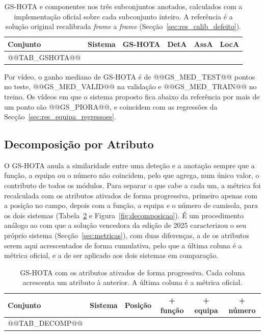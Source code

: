 \begin{table}[htbp]
    \centering
    \caption{GS-HOTA e componentes nos três subconjuntos anotados, calculados com a implementação
    oficial sobre cada subconjunto inteiro. A referência é a solução original recalibrada
    \emph{frame} a \emph{frame} (Secção~\ref{sec:res_calib_defeito}).}
    \label{tab:gshota}
    \begin{tabular}{|l|l|c|c|c|c|}
        \hline
        \textbf{Conjunto} & \textbf{Sistema} & \textbf{GS-HOTA} & \textbf{DetA} & \textbf{AssA} & \textbf{LocA} \\
        \hline
@@TAB_GSHOTA@@
        \hline
    \end{tabular}
\end{table}

Por vídeo, o ganho mediano de GS-HOTA é de @@GS_MED_TEST@@ pontos no teste, @@GS_MED_VALID@@ na
validação e @@GS_MED_TRAIN@@ no treino. Os vídeos em que o sistema proposto fica abaixo da referência
por mais de um ponto são @@GS_PIORA@@, e coincidem com as regressões da
Secção~\ref{sec:res_equipa_regressoes}.

\subsection{Decomposição por Atributo}\label{sec:res_decomposicao}

O GS-HOTA anula a similaridade entre uma deteção e a anotação sempre que a função, a equipa ou o
número não coincidem, pelo que agrega, num único valor, o contributo de todos os módulos. Para
separar o que cabe a cada um, a métrica foi recalculada com os atributos ativados de forma
progressiva, primeiro apenas com a posição no campo, depois com a função, a equipa e o número de
camisola, para os dois sistemas (Tabela~\ref{tab:decomposicao} e Figura~\ref{fig:decomposicao}).
É um procedimento análogo ao com que a solução vencedora da edição de 2025 caracterizou o seu
próprio sistema (Secção~\ref{sec:metricas}), com duas diferenças, a de os atributos serem aqui
acrescentados de forma cumulativa, pelo que a última coluna é a métrica oficial, e a de ser aplicado
aos dois sistemas em comparação.

\begin{table}[htbp]
    \centering
    \caption{GS-HOTA com os atributos ativados de forma progressiva. Cada coluna acrescenta um
    atributo à anterior. A última coluna é a métrica oficial.}
    \label{tab:decomposicao}
    \begin{tabular}{|l|l|c|c|c|c|}
        \hline
        \textbf{Conjunto} & \textbf{Sistema} & \textbf{Posição} & \textbf{+ função} & \textbf{+ equipa} & \textbf{+ número} \\
        \hline
@@TAB_DECOMP@@
        \hline
    \end{tabular}
\end{table}

